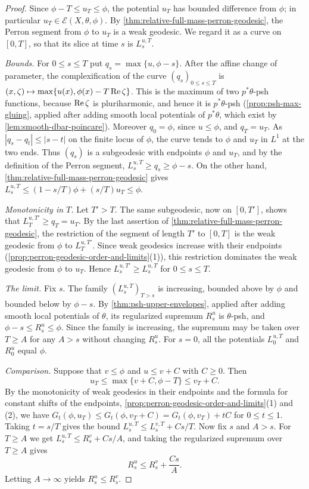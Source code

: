 \begin{proof}
Since $\phi-T\leq u_T\leq\phi$, the potential $u_T$ has bounded difference from $\phi$; in particular $u_T\in\mathcal E(X,\theta,\phi)$. By \cref{thm:relative-full-mass-perron-geodesic}, the Perron segment from $\phi$ to $u_T$ is a weak geodesic. We regard it as a curve on $[0,T]$, so that its slice at time $s$ is $L_s^{u,T}$.

\emph{Bounds.} For $0\leq s\leq T$ put $q_s=\max\{u,\phi-s\}$. After the affine change of parameter, the complexification of the curve $(q_s)_{0\leq s\leq T}$ is $(x,\zeta)\mapsto\max\{u(x),\phi(x)-T\operatorname{Re}\zeta\}$. This is the maximum of two $p^*\theta$-psh functions, because $\operatorname{Re}\zeta$ is pluriharmonic, and hence it is $p^*\theta$-psh (\cref{prop:psh-max-gluing}, applied after adding smooth local potentials of $p^*\theta$, which exist by \cref{lem:smooth-dbar-poincare}). Moreover $q_0=\phi$, since $u\leq\phi$, and $q_T=u_T$. As $|q_s-q_t|\leq|s-t|$ on the finite locus of $\phi$, the curve tends to $\phi$ and $u_T$ in $L^1$ at the two ends. Thus $(q_s)$ is a subgeodesic with endpoints $\phi$ and $u_T$, and by the definition of the Perron segment, $L_s^{u,T}\geq q_s\geq\phi-s$. On the other hand, \cref{thm:relative-full-mass-perron-geodesic} gives $L_s^{u,T}\leq(1-s/T)\phi+(s/T)u_T\leq\phi$.

\emph{Monotonicity in $T$.} Let $T'>T$. The same subgeodesic, now on $[0,T']$, shows that $L_T^{u,T'}\geq q_T=u_T$. By the last assertion of \cref{thm:relative-full-mass-perron-geodesic}, the restriction of the segment of length $T'$ to $[0,T]$ is the weak geodesic from $\phi$ to $L_T^{u,T'}$. Since weak geodesics increase with their endpoints (\cref{prop:perron-geodesic-order-and-limits}(1)), this restriction dominates the weak geodesic from $\phi$ to $u_T$. Hence $L_s^{u,T'}\geq L_s^{u,T}$ for $0\leq s\leq T$.

\emph{The limit.} Fix $s$. The family $(L_s^{u,T})_{T>s}$ is increasing, bounded above by $\phi$ and bounded below by $\phi-s$. By \cref{thm:psh-upper-envelopes}, applied after adding smooth local potentials of $\theta$, its regularized supremum $R_s^u$ is $\theta$-psh, and $\phi-s\leq R_s^u\leq\phi$. Since the family is increasing, the supremum may be taken over $T\geq A$ for any $A>s$ without changing $R_s^u$. For $s=0$, all the potentials $L_0^{u,T}$ and $R_0^u$ equal $\phi$.

\emph{Comparison.} Suppose that $v\leq\phi$ and $u\leq v+C$ with $C\geq0$. Then
\[
 u_T\leq\max\{v+C,\phi-T\}\leq v_T+C.
\]
By the monotonicity of weak geodesics in their endpoints and the formula for constant shifts of the endpoints, \cref{prop:perron-geodesic-order-and-limits}(1) and (2), we have $G_t(\phi,u_T)\leq G_t(\phi,v_T+C)=G_t(\phi,v_T)+tC$ for $0\leq t\leq1$. Taking $t=s/T$ gives the bound $L_s^{u,T}\leq L_s^{v,T}+Cs/T$. Now fix $s$ and $A>s$. For $T\geq A$ we get $L_s^{u,T}\leq R_s^v+Cs/A$, and taking the regularized supremum over $T\geq A$ gives
\[
 R_s^u\leq R_s^v+\frac{Cs}{A}.
\]
Letting $A\to\infty$ yields $R_s^u\leq R_s^v$.


\end{proof}
